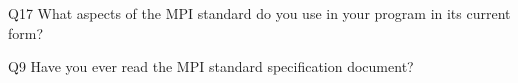 \begin{description}%
\item{Q17} What aspects of the MPI standard do you use in your program in its current form?%
\item{Q9} Have you ever read the MPI standard specification document?%
\end{description}%
